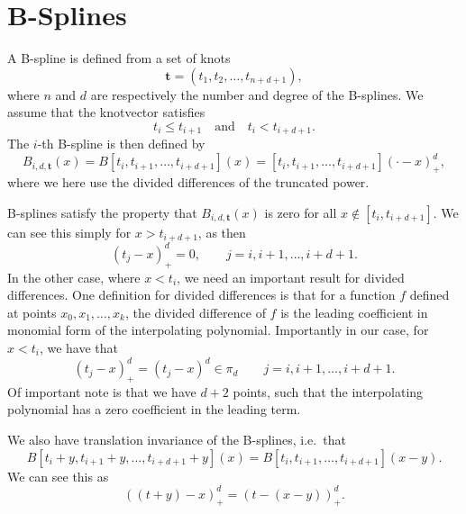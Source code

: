 \section{B-Splines}
A B-spline is defined from a set of knots
\begin{equation}
    \boldsymbol{t} = (t_1, t_2, \dots, t_{n + d + 1}),
\end{equation}
where $n$ and $d$ are respectively the number and degree of the B-splines.
We assume that the knotvector satisfies
\begin{equation}
    t_{i} \leq t_{i + 1}
    \quad\text{and}\quad
    t_{i} < t_{i + d + 1}.
\end{equation}
The $i$-th B-spline is then defined by
\begin{equation}
    B_{i, d, \boldsymbol{t}}(x)
    = B[t_i, t_{i + 1}, \dots, t_{i + d + 1}](x)
    = [t_i, t_{i + 1}, \dots, t_{i + d + 1}](\cdot - x)_+^d,
\end{equation}
where we here use the divided differences of the truncated power.

B-splines satisfy the property that $B_{i, d, \boldsymbol{t}}(x)$ is zero for all $x \notin [t_i, t_{i + d + 1}]$.
We can see this simply for $x > t_{i + d + 1}$, as then
\begin{equation}
    (t_j - x)_+^d = 0,
    \qquad
    j = i, i + 1, \dots, i + d + 1.
\end{equation}
In the other case, where $x < t_i$, we need an important result for divided differences.
One definition for divided differences is that for a function $f$ defined at points $x_0, x_1, \dots, x_k$, the divided difference of $f$ is the leading coefficient in monomial form of the interpolating polynomial.
Importantly in our case, for $x < t_i$, we have that
\begin{equation}
    (t_j - x)_+^d = (t_j - x)^d \in \pi_d
    \qquad
    j = i, i + 1, \dots, i + d + 1.
\end{equation}
Of important note is that we have $d + 2$ points, such that the interpolating polynomial has a zero coefficient in the leading term.

We also have translation invariance of the B-splines, i.e.\ that
\begin{equation}
    B[t_i + y, t_{i + 1} + y, \dots, t_{i + d + 1} + y](x)
    = B[t_i, t_{i + 1}, \dots, t_{i + d + 1}](x - y).
\end{equation}
We can see this as
\begin{equation}
    ((t + y) - x)_+^d = (t - (x - y))_+^d.
\end{equation}

